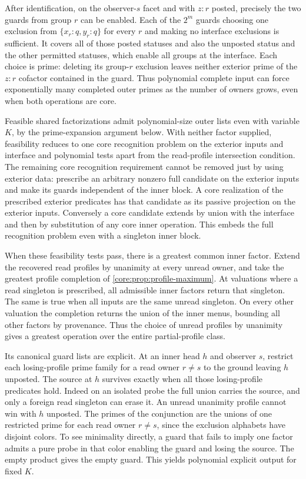 After identification, on the observer-$s$ facet and with $z:r$
posted, precisely the two guards from group $r$ can be enabled.
Each of the $2^m$ guards choosing one exclusion from
$\{x_r:q,y_r:q\}$ for every $r$ and making no interface exclusions
is sufficient. It covers all of those posted statuses and also
the unposted status and the other permitted statuses, which
enable all groups at the interface. Each choice is prime:
deleting its group-$r$ exclusion leaves neither exterior prime
of the $z:r$ cofactor contained in the guard. Thus polynomial
complete input can force exponentially many completed outer
primes as the number of owners grows, even when both operations
are core.

Feasible shared factorizations admit polynomial-size outer lists
even with variable $K$, by the prime-expansion argument below.
With neither factor supplied, feasibility reduces to one core
recognition problem on the exterior inputs and interface and
polynomial tests apart from the read-profile intersection condition.
The remaining core recognition requirement cannot be
removed just by using exterior data: prescribe an arbitrary
nonzero full candidate on the exterior inputs and make its
guards independent of the inner block. A core realization of
the prescribed exterior predicates has that candidate as its
passive projection on the exterior inputs. Conversely a core
candidate extends by union with the interface and then by
substitution of any core inner operation. This embeds the full
recognition problem even with a singleton inner block.

When these feasibility tests pass, there is a greatest common
inner factor. Extend the recovered read profiles by unanimity at
every unread owner, and take the greatest profile completion of
\cref{core:prop:profile-maximum}. At valuations where a read
singleton is prescribed, all admissible inner factors return
that singleton. The same is true when all inputs are the same
unread singleton. On every other valuation the completion returns
the union of the inner menus, bounding all other factors by
provenance. Thus the choice of unread profiles by unanimity
gives a greatest operation over the entire partial-profile class.

Its canonical guard lists are explicit. At an inner head $h$ and
observer $s$, restrict each losing-profile prime family for a read
owner $r\ne s$ to the ground leaving $h$ unposted. The source at
$h$ survives exactly when all those losing-profile predicates
hold. Indeed on an isolated probe the full union carries the
source, and only a foreign read singleton can erase it. An unread
unanimity profile cannot win with $h$ unposted. The primes of the
conjunction are the unions of one restricted prime for each read
owner $r\ne s$, since the exclusion alphabets have disjoint colors.
To see minimality directly, a guard that fails to imply one
factor admits a pure probe in that color enabling the guard and
losing the source. The empty product gives the empty guard.
This yields polynomial explicit output for fixed $K$.

